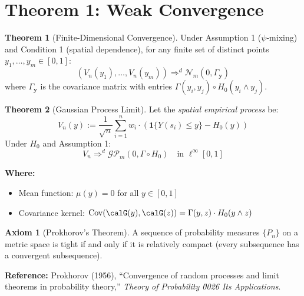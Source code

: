 \documentclass[11pt,a4paper]{amsart}
\theoremstyle{definition}
\newtheorem{theorem}{Theorem}[section]
\newtheorem{axiom}{Axiom}[section]
\newcommand{\ind}{\mathbf{1}}
\newcommand{\Cov}{\operatorname{Cov}}
\newcommand{\aslim}{\Rightarrow^d}
\newcommand{\GP}{\mathcal{GP}}
\begin{document}
\section{Theorem 1: Weak Convergence}
\label{sec:theorem1}

\begin{theorem}[Finite-Dimensional Convergence]
\label{thm:fdd-conv}
Under Assumption 1 ($\psi$-mixing) and Condition 1 (spatial dependence), for any 
finite set of distinct points $y_1, \dots, y_m \in [0,1]$:
\begin{equation*}
(V_n(y_1), \dots, V_n(y_m)) \aslim \mathcal{N}_m(0, \Gamma_{\mathbf{y}})
\end{equation*}
where $\Gamma_{\mathbf{y}}$ is the covariance matrix with entries 
$\Gamma(y_i, y_j) \circ H_0(y_i \wedge y_j)$.
\end{theorem}

\begin{theorem}[Gaussian Process Limit]
\label{thm:gp-limit}
Let the \emph{spatial empirical process} be:
\begin{equation*}
V_n(y) := \frac{1}{\sqrt{n}} \sum_{i=1}^n w_i \cdot (\ind\{Y(s_i) \leq y\} - H_0(y))
\end{equation*}
Under $H_0$ and Assumption 1:
\begin{equation*}
V_n \aslim \GP_m(0, \Gamma \circ H_0) \quad \text{in } \ell^\infty[0,1]
\end{equation*}

\textbf{Where:}
\begin{itemize}
\item Mean function: $\mu(y) = 0$ for all $y \in [0,1]$
\item Covariance kernel: $\Cov(\calG(y), \calG(z)) = \Gamma(y,z) \cdot H_0(y \wedge z)$
\end{itemize}
\end{theorem}

\begin{axiom}[Prokhorov's Theorem]
\label{ax:prokhorov}
A sequence of probability measures $\{P_n\}$ on a metric space is tight if and only if 
it is relatively compact (every subsequence has a convergent subsequence).

\textbf{Reference:} Prokhorov (1956), ``Convergence of random processes and limit 
theorems in probability theory,'' \textit{Theory of Probability \u0026 Its Applications}.
\end{axiom}
\end{document}
